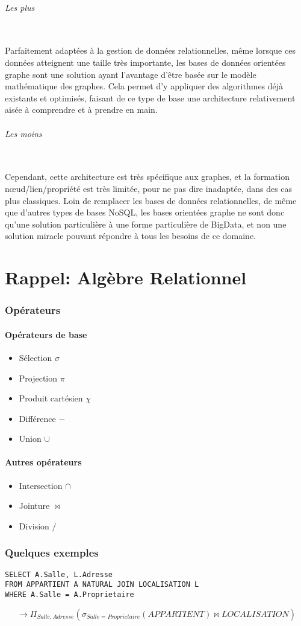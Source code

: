 \documentclass[a4paper,11pt]{article}
\begin{document}
		\paragraph{Les plus}~\\
		
		Parfaitement adaptées à la gestion de données relationnelles, même lorsque ces données atteignent une taille très importante, les bases de données orientées graphe sont une solution ayant l’avantage d’être basée sur le modèle mathématique des graphes. Cela permet d’y appliquer des algorithmes déjà existants et optimisés, faisant de ce type de base une architecture relativement aisée à comprendre et à prendre en main.

		\paragraph{Les moins}~\\
		
		Cependant, cette architecture est très spécifique aux graphes, et la formation n\oe{}ud/lien/propriété est très limitée, pour ne pas dire inadaptée, dans des cas plus classiques. Loin de remplacer les bases de données relationnelles, de même que d’autres types de bases NoSQL, les bases orientées graphe ne sont donc qu’une solution particulière à une forme particulière de BigData, et non une solution \og{}miracle\fg{} pouvant répondre à tous les besoins de ce domaine.

\part{Rappel: Algèbre Relationnel}
	\section{Opérateurs}
		\subsection{Opérateurs de base}
		\begin{itemize}
			\item Sélection $\sigma$
			\item Projection $\pi$
			\item Produit cartésien $\chi$
			\item Différence $-$
			\item Union $\cup$
		\end{itemize}
		
		\subsection{Autres opérateurs}
		\begin{itemize}
			\item Intersection $\cap$
			\item Jointure $\Join$
			\item Division $/$
		\end{itemize}
		
	\section{Quelques exemples}
		\begin{lstlisting}
SELECT A.Salle, L.Adresse
FROM APPARTIENT A NATURAL JOIN LOCALISATION L
WHERE A.Salle = A.Proprietaire
		\end{lstlisting}
		
		$$\rightarrow \Pi_{Salle,Adresse}(\sigma_{Salle=Proprietaire}(APPARTIENT) \Join LOCALISATION) $$
\end{document}
